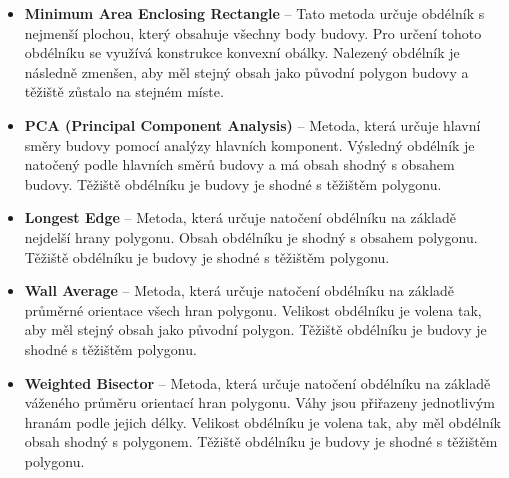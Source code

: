 \begin{itemize}
    \item \textbf{Minimum Area Enclosing Rectangle} – Tato metoda určuje obdélník s nejmenší plochou, který obsahuje všechny body budovy. Pro určení tohoto obdélníku se využívá konstrukce konvexní obálky. Nalezený obdélník je následně zmenšen, aby měl stejný obsah jako původní polygon budovy a těžiště zůstalo na stejném míste.

    \item \textbf{PCA (Principal Component Analysis)} – Metoda, která určuje hlavní směry budovy pomocí analýzy hlavních komponent. Výsledný obdélník je natočený podle hlavních směrů budovy a má obsah shodný s obsahem budovy. Těžiště obdélníku je budovy je shodné s těžištěm polygonu.
    
    \item \textbf{Longest Edge} – Metoda, která určuje natočení obdélníku na základě nejdelší hrany polygonu. Obsah obdélníku je shodný s obsahem polygonu. Těžiště obdélníku je budovy je shodné s těžištěm polygonu.
    
    \item \textbf{Wall Average} – Metoda, která určuje natočení obdélníku na základě průměrné orientace všech hran polygonu. Velikost obdélníku je volena tak, aby měl stejný obsah jako původní polygon. Těžiště obdélníku je budovy je shodné s těžištěm polygonu.
    
    \item \textbf{Weighted Bisector} – Metoda, která určuje natočení obdélníku na základě váženého průměru orientací hran polygonu. Váhy jsou přiřazeny jednotlivým hranám podle jejich délky. Velikost obdélníku je volena tak, aby měl obdélník obsah shodný s polygonem. Těžiště obdélníku je budovy je shodné s těžištěm polygonu.
\end{itemize}